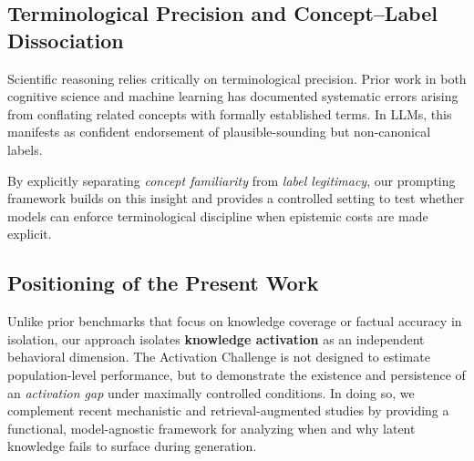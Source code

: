 \subsection{Terminological Precision and Concept--Label Dissociation}

Scientific reasoning relies critically on terminological precision. Prior work in both cognitive science and machine learning has documented systematic errors arising from conflating related concepts with formally established terms. In LLMs, this manifests as confident endorsement of plausible-sounding but non-canonical labels.

By explicitly separating \emph{concept familiarity} from \emph{label legitimacy}, our prompting framework builds on this insight and provides a controlled setting to test whether models can enforce terminological discipline when epistemic costs are made explicit.


\subsection{Positioning of the Present Work}

Unlike prior benchmarks that focus on knowledge coverage or factual accuracy in isolation, our approach isolates \textbf{knowledge activation} as an independent behavioral dimension. The Activation Challenge is not designed to estimate population-level performance, but to demonstrate the existence and persistence of an \emph{activation gap} under maximally controlled conditions. In doing so, we complement recent mechanistic and retrieval-augmented studies by providing a functional, model-agnostic framework for analyzing when and why latent knowledge fails to surface during generation.


